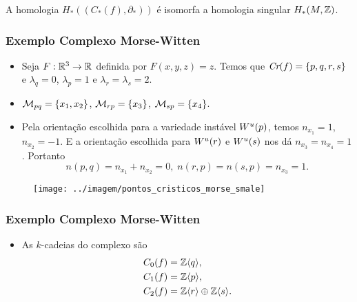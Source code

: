 \documentclass{beamer}
\begin{document}
\begin{footnotesize}
\begin{frame}
		
		\begin{teorema}
			 A homologia $H_{*}((C_{*}(f), \partial_{*})) $ é isomorfa a homologia singular $H_{*}(M, \mathbb{Z})$.
		\end{teorema}
	\end{frame}
	
	
	
	\begin{frame}
		
		\frametitle{Exemplo Complexo Morse-Witten}
		
		\begin{minipage}[t]{0.5\linewidth}
			
			\begin{itemize}
				\item Seja $F:\mathbb{R}^{3} \to \mathbb{R}^{}$ definida por $F(x, y, z) = z$. Temos que $\textit{Cr}(f) = \{p,q,r,s\}$ e $\lambda_{q} = 0$, $\lambda_{p} = 1$ e $\lambda_{r}=\lambda_{s} = 2$. 
				
				\item $\mathcal{M}_{pq}=\{x_{1}, x_{2}\}$, $\mathcal{M}_{rp} = \{ x_{3}\}$, $\mathcal{M}_{sp} = \{x_{4} \}$.
				
				\item Pela orientação escolhida para a variedade instável $W^{u}(p)$, temos $n_{x_{1}}=1$, $n_{x_{2}} = -1$. E a orientação escolhida para $W^{u}(r)$ e $W^{u}(s)$ nos dá $n_{x_{3}} =n_{x_{4}}= 1$. Portanto 
				$$
				n(p,q) = n_{x_{1}}+n_{x_{2}} = 0,\; n(r,p) = n(s,p)=n_{x_{3}}= 1. 
				$$			
			\end{itemize}
		\end{minipage}
		\hfill%
			\begin{minipage}[t]{0.4\linewidth}
				\begin{figure}
					\centering
					\textbf{}\par
					\texttt{[image: ../imagem/pontos\_cristicos\_morse\_smale]}
				\end{figure}
				
			\end{minipage}
	
	\end{frame}
	
	\begin{frame}
		\frametitle{Exemplo Complexo Morse-Witten}
		\begin{minipage}[t]{0.5\linewidth}
			\begin{itemize}
				\item As $k$-cadeias do complexo são
				$$
				\begin{aligned}
				C_{0}(f) &= \mathbb{Z}\langle q\rangle, 
				\\
				C_{1}(f) &= \mathbb{Z}\langle p\rangle,
				\\
				C_{2}(f) &= \mathbb{Z}\langle r\rangle\oplus\mathbb{Z}\langle s\rangle.
				\end{aligned}
				$$
				

\end{itemize}
\end{minipage}
\end{frame}
\end{footnotesize}
\end{document}
